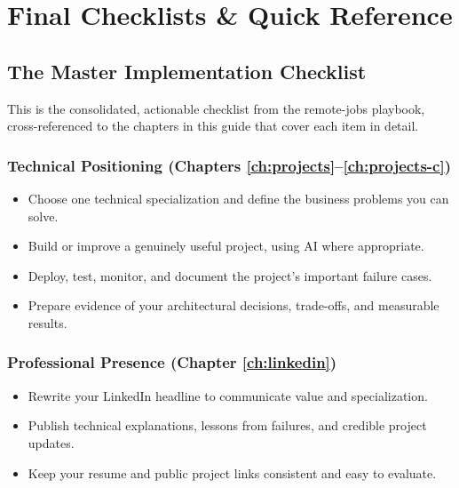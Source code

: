 \chapter{Final Checklists \& Quick Reference}
\label{ch:checklists}

\section{The Master Implementation Checklist}

This is the consolidated, actionable checklist from the remote-jobs playbook, cross-referenced to the chapters in
this guide that cover each item in detail.

\subsection{Technical Positioning (Chapters \ref{ch:projects}--\ref{ch:projects-c})}
\begin{itemize}[nosep]
  \item[$\square$] Choose one technical specialization and define the business problems you can solve.
  \item[$\square$] Build or improve a genuinely useful project, using AI where appropriate.
  \item[$\square$] Deploy, test, monitor, and document the project's important failure cases.
  \item[$\square$] Prepare evidence of your architectural decisions, trade-offs, and measurable results.
\end{itemize}

\subsection{Professional Presence (Chapter \ref{ch:linkedin})}
\begin{itemize}[nosep]
  \item[$\square$] Rewrite your LinkedIn headline to communicate value and specialization.
  \item[$\square$] Publish technical explanations, lessons from failures, and credible project updates.
  \item[$\square$] Keep your resume and public project links consistent and easy to evaluate.
\end{itemize}

